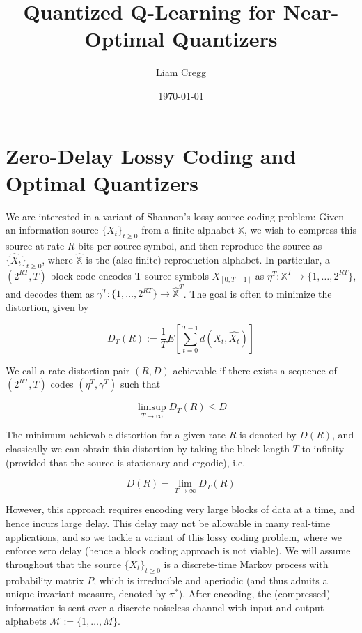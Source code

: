 \documentclass{article}
\title{Quantized Q-Learning for Near-Optimal Quantizers}
\date{\today}
\author{Liam Cregg}
\begin{document}
\begin{titlepage}
    \maketitle
\end{titlepage}

\newpage

\section{Zero-Delay Lossy Coding and Optimal Quantizers}\label{optimal quantizers}
We are interested in a variant of Shannon's lossy source coding problem: Given an information source \( \{X_t\}_{t\ge0} \) from a finite alphabet \( \mathbb{X} \), we wish to compress this source at rate \(R\) bits per source symbol, and then reproduce the source as \( \{\hat{X}_t\}_{t\ge0} \), where \(\hat{\mathbb{X}}\) is the (also finite) reproduction alphabet. In particular, a \((2^{RT},T)\) block code encodes T source symbols \(X_{[0,T-1]}\) as \(\eta^T : \mathbb{X}^T \to \{1,\ldots,2^{RT}\} \), and decodes them as \( \gamma^T : \{1,\ldots,2^{RT}\} \to \hat{\mathbb{X}}^T \). The goal is often to minimize the distortion, given by %

\[ D_T(R) := \frac{1}{T} E[\sum_{t=0}^{T-1}d(X_t,\hat{X_t})]\] %

We call a rate-distortion pair \((R,D)\) achievable if there exists a sequence of \((2^{RT},T)\) codes \((\eta^T,\gamma^T)\) such that

\[ \limsup_{T \to \infty}D_T(R) \le D\]

The minimum achievable distortion for a given rate \(R\) is denoted by \(D(R)\), and classically we can obtain this distortion by taking the block length \(T\) to infinity (provided that the source is stationary and ergodic), i.e.

\[D(R) = \lim_{T \to  \infty}D_T(R)\]

However, this approach requires encoding very large blocks of data at a time, and hence incurs large delay. This delay may not be allowable in many real-time applications, and so we tackle a variant of this lossy coding problem, where we enforce zero delay (hence a block coding approach is not viable). We will assume throughout that the source \( \{X_t\}_{t \ge 0} \) is a discrete-time Markov process with probability matrix \( P \), which is irreducible and aperiodic (and thus admits a unique invariant measure, denoted by \( \pi^* \)). After encoding, the (compressed) information is sent over a discrete noiseless channel with input and output alphabets \( \mathcal{M} := \{1,\ldots,M\} \). %
\end{document}
